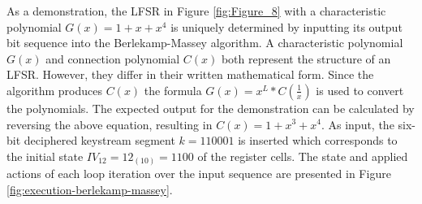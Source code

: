 \clearpage

As a demonstration, the LFSR in Figure \ref{fig:Figure_8} with a characteristic polynomial $G(x) = 1+x+x^4$ is uniquely determined by inputting its output bit sequence into the Berlekamp-Massey algorithm. A characteristic polynomial $G(x)$ and connection polynomial $C(x)$ both represent the structure of an LFSR. However, they differ in their written mathematical form. Since the algorithm produces $C(x)$ the formula $G(x) = x^L * C(\frac{1}{x})$ is used to convert the polynomials. The expected output for the demonstration can be calculated by reversing the above equation, resulting in $C(x) = 1+x^3+x^4$. As input, the six-bit deciphered keystream segment $k=110001$ is inserted which corresponds to the initial state $IV_{12}=12_{(10)}=1100$ of the register cells. The state and applied actions of each loop iteration over the input sequence are presented in Figure \ref{fig:execution-berlekamp-massey}. \\ 

